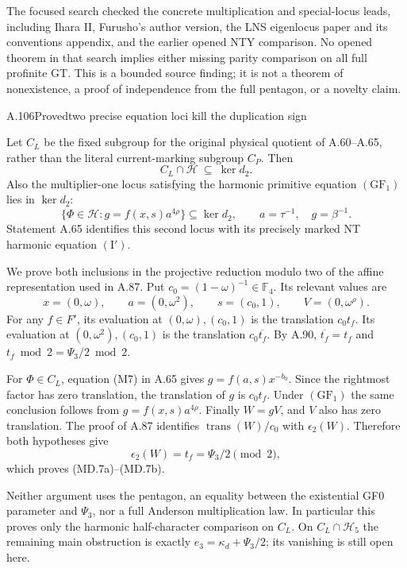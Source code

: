 The focused search checked the concrete multiplication and
special-locus leads, including Ihara II, Furusho's author version,
the LNS eigenlocus paper and its conventions appendix, and the
earlier opened NTY comparison. No opened theorem in that search
implies either missing parity comparison on all full profinite GT.
This is a bounded source finding; it is not a theorem of
nonexistence, a proof of independence from the full pentagon,
or a novelty claim.

\begin{statement}{A.106}{Proved}{two precise equation loci kill the duplication sign}
\end{statement}
Let $C_L$ be the fixed subgroup for the original physical quotient
of A.60--A.65, rather than the literal current-marking subgroup $C_P$.
Then
\[
 C_L\cap\mathcal H\ \subseteq\ \ker d_2.
 \tag{MD.7a}
\]
Also the multiplier-one locus satisfying the harmonic primitive
equation $(\mathrm{GF}_1)$ lies in $\ker d_2$:
\[
 \{\Phi\in\mathcal H:g=f(x,s)a^{4\rho}\}\subseteq\ker d_2,
 \qquad a=\tau^{-1},\quad g=\beta^{-1}.
 \tag{MD.7b}
\]
Statement A.65 identifies this second locus with its precisely marked
NT harmonic equation $(\mathrm I')$.

We prove both inclusions in the projective reduction modulo two
of the affine representation used in A.87. Put
$c_0=(1-\omega)^{-1}\in\mathbb F_4$. Its relevant values are
\[
 x=(0,\omega),\qquad a=(0,\omega^2),\qquad
 s=(c_0,1),\qquad V=(0,\omega^\rho).
\]
For any $f\in F'$, its evaluation at
$(0,\omega),(c_0,1)$ is the translation $c_0t_f$.
Its evaluation at $(0,\omega^2),(c_0,1)$ is the translation
$c_0\overline{t_f}$. By A.90, $\overline{t_f}=t_f$ and
$t_f\bmod2=\Psi_3/2\bmod2$.

For $\Phi\in C_L$, equation (M7) in A.65 gives
$g=f(a,s)x^{-b_0}$. Since the rightmost factor has zero
translation, the translation of $g$ is $c_0t_f$.
Under $(\mathrm{GF}_1)$ the same conclusion follows from
$g=f(x,s)a^{4\rho}$. Finally $W=gV$, and $V$ also has
zero translation. The proof of A.87 identifies
$\operatorname{trans}(W)/c_0$ with $\epsilon_2(W)$.
Therefore both hypotheses give
\[
 \epsilon_2(W)=t_f=\Psi_3/2\pmod2,
\]
which proves (MD.7a)--(MD.7b).

Neither argument uses the pentagon, an equality between the
existential GF0 parameter and $\Psi_3$, nor a full Anderson
multiplication law. In particular this proves only the harmonic
half-character comparison on $C_L$. On
$C_L\cap\mathcal H_5$ the remaining main obstruction is exactly
$e_3=\kappa_d+\Psi_3/2$; its vanishing is still open here.


